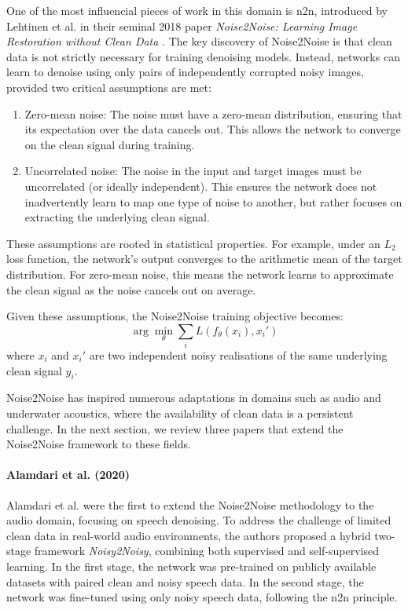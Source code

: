 One of the most influencial pieces of work in this domain is \acrfull{n2n}, introduced by Lehtinen et al. in their seminal 2018 paper \textit{Noise2Noise: Learning Image Restoration without Clean Data} \cite{lehtinen_noise2noise_2018}. The key discovery of Noise2Noise is that clean data is not strictly necessary for training denoising models. Instead, networks can learn to denoise using only pairs of independently corrupted noisy images, provided two critical assumptions are met:
\begin{enumerate}
    \item Zero-mean noise: The noise must have a zero-mean distribution, ensuring that its expectation over the data cancels out. This allows the network to converge on the clean signal during training.
    \item Uncorrelated noise: The noise in the input and target images must be uncorrelated (or ideally independent). This ensures the network does not inadvertently learn to map one type of noise to another, but rather focuses on extracting the underlying clean signal.
\end{enumerate}
These assumptions are rooted in statistical properties. For example, under an $L_2$ loss function, the network's output converges to the arithmetic mean of the target distribution. For zero-mean noise, this means the network learns to approximate the clean signal as the noise cancels out on average. %

Given these assumptions, the Noise2Noise training objective becomes:
\begin{equation}
    \arg \min_\theta \sum_i L(f_\theta (x_i), x_i')
\end{equation}
where $x_i$ and $x_i'$ are two independent noisy realisations of the same underlying clean signal $y_i$.

Noise2Noise has inspired numerous adaptations in domains such as audio and underwater acoustics, where the availability of clean data is a persistent challenge. In the next section, we review three papers that extend the Noise2Noise framework to these fields.

\paragraph{Alamdari et al. (2020)}

Alamdari et al. \cite{alamdari_improving_2020} were the first to extend the Noise2Noise methodology to the audio domain, focusing on speech denoising. To address the challenge of limited clean data in real-world audio environments, the authors proposed a hybrid two-stage framework \textit{Noisy2Noisy}, combining both supervised and self-supervised learning. In the first stage, the network was pre-trained on publicly available datasets with paired clean and noisy speech data. In the second stage, the network was fine-tuned using only noisy speech data, following the \acrshort{n2n} principle.

